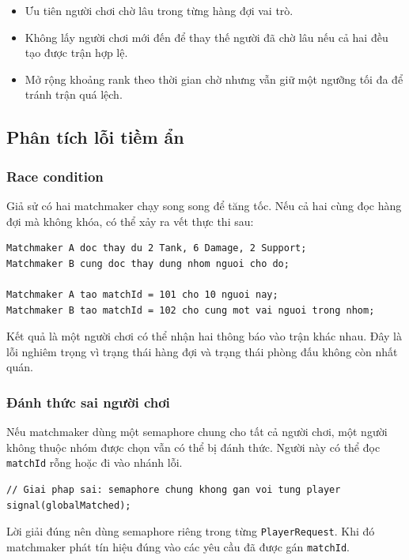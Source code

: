 \begin{itemize}
    \item Ưu tiên người chơi chờ lâu trong từng hàng đợi vai trò.
    \item Không lấy người chơi mới đến để thay thế người đã chờ lâu nếu cả hai
    đều tạo được trận hợp lệ.
    \item Mở rộng khoảng rank theo thời gian chờ nhưng vẫn giữ một ngưỡng tối đa
    để tránh trận quá lệch.
\end{itemize}

\subsection{Phân tích lỗi tiềm ẩn}

\subsubsection*{Race condition}

Giả sử có hai matchmaker chạy song song để tăng tốc. Nếu cả hai cùng đọc hàng
đợi mà không khóa, có thể xảy ra vết thực thi sau:

\begin{lstlisting}
Matchmaker A doc thay du 2 Tank, 6 Damage, 2 Support;
Matchmaker B cung doc thay dung nhom nguoi cho do;

Matchmaker A tao matchId = 101 cho 10 nguoi nay;
Matchmaker B tao matchId = 102 cho cung mot vai nguoi trong nhom;
\end{lstlisting}

Kết quả là một người chơi có thể nhận hai thông báo vào trận khác nhau. Đây là
lỗi nghiêm trọng vì trạng thái hàng đợi và trạng thái phòng đấu không còn nhất
quán.

\subsubsection*{Đánh thức sai người chơi}

Nếu matchmaker dùng một semaphore chung cho tất cả người chơi, một người không
thuộc nhóm được chọn vẫn có thể bị đánh thức. Người này có thể đọc
\texttt{matchId} rỗng hoặc đi vào nhánh lỗi.

\begin{lstlisting}
// Giai phap sai: semaphore chung khong gan voi tung player
signal(globalMatched);
\end{lstlisting}

Lời giải đúng nên dùng semaphore riêng trong từng \texttt{PlayerRequest}. Khi
đó matchmaker phát tín hiệu đúng vào các yêu cầu đã được gán \texttt{matchId}.

